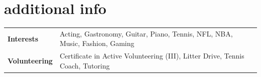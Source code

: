 \documentclass[12pt]{article}
\begin{document}
\section{additional info}

\hspace{-2.5em} \begin{tabular}{>{\raggedright}p{} p{}}
  \textbf{Interests} & Acting, Gastronomy, Guitar, Piano, Tennis, NFL, NBA, Music, Fashion, Gaming \\
  \textbf{Volunteering} & Certificate in Active Volunteering (III), Litter Drive, Tennis Coach, Tutoring
\end{tabular}
\end{document}
